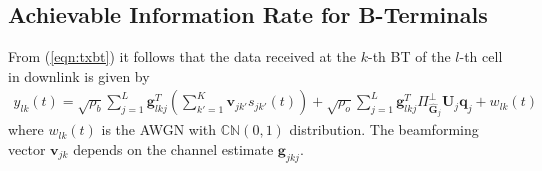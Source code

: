 \documentclass[10pt, a4paper, twoside,fleqn]{article}
\begin{document}
\subsection{Achievable Information Rate for B-Terminals}
From (\ref{eqn:txbt}) it follows that the data received at the $k$-th BT of the $l$-th cell in downlink is given by
\begin{eqnarray}\label{eq:ot}
 	y_{lk}(t) = \sqrt{\rho_b}\sum_{j=1}^{L} \pmb{g}_{lkj}^{T} \left(\sum_{k'=1}^{K}\pmb{v}_{jk'}s_{jk'}(t)\right)
 		      + \sqrt{\rho_o}\sum_{j=1}^{L}\pmb{g}^T_{lkj} \Pi^{\perp}_{{\pmb{\hat{G}}_j}} \pmb{U}_j\pmb{q}_{j}+ w_{lk}(t)
\end{eqnarray} 
where $w_{lk}(t)$ is the AWGN with ${\mathbb C}{\mathbb N}(0,1)$  distribution. The beamforming vector $\pmb{v}_{jk}$ depends on the channel estimate $\pmb{g}_{jkj}$.
\end{document}

